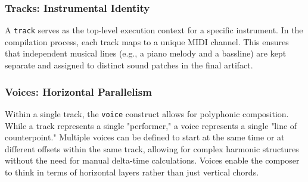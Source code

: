 \subsubsection{Tracks: Instrumental Identity}
A \texttt{track} serves as the top-level execution context for a specific instrument.
In the compilation process, each track maps to a unique MIDI channel.
This ensures that independent musical lines (e.g., a piano melody and a bassline) are kept separate and
assigned to distinct sound patches in the final artifact.

\subsubsection{Voices: Horizontal Parallelism}
Within a single track, the \texttt{voice} construct allows for polyphonic composition.
While a track represents a single "performer," a voice represents a single "line of counterpoint."
Multiple voices can be defined to start at the same time or at different offsets within the same track,
allowing for complex harmonic structures without the need for manual delta-time calculations.
Voices enable the composer to think in terms of horizontal layers rather than just vertical chords.
